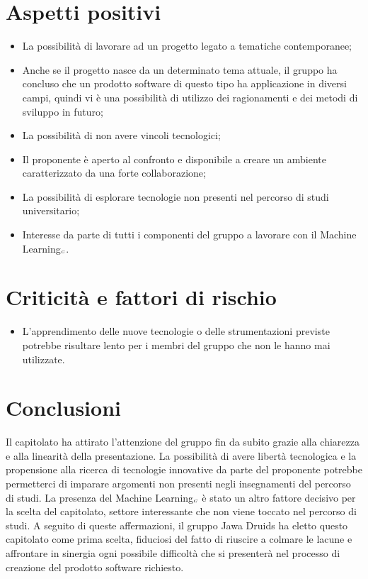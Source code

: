 \section{Aspetti positivi} \label{C3AspettiPositivi}
\begin{itemize}
	\item La possibilità di lavorare ad un progetto legato a tematiche contemporanee;
	\item Anche se il progetto nasce da un determinato tema attuale, il gruppo ha concluso che un prodotto software di questo tipo ha applicazione in diversi campi, quindi vi è una possibilità di utilizzo dei ragionamenti e dei metodi di sviluppo in futuro;
	\item La possibilità di non avere vincoli tecnologici;
	\item Il proponente è aperto al confronto e disponibile a creare un ambiente caratterizzato da una forte collaborazione;
	\item La possibilità di esplorare tecnologie non presenti nel percorso di studi universitario;
	\item Interesse da parte di tutti i componenti del gruppo a lavorare con il Machine Learning$_{\scaleto{G}{3pt}}$.
\end{itemize}
\section{Criticità e fattori di rischio} \label{C3CriticitàEFattoriDiRischio}
\begin{itemize}
	\item L'apprendimento delle nuove tecnologie o delle strumentazioni previste potrebbe risultare lento per i membri del gruppo che non le hanno mai utilizzate.
\end{itemize}
\section{Conclusioni} \label{C3Conclusioni}
Il capitolato ha attirato l'attenzione del gruppo fin da subito grazie alla chiarezza e alla linearità della presentazione. La possibilità di avere libertà tecnologica e la propensione alla ricerca di tecnologie innovative da parte del proponente potrebbe permetterci di imparare argomenti non presenti negli insegnamenti del percorso di studi. La presenza del Machine Learning$_{\scaleto{G}{3pt}}$ è stato un altro fattore decisivo per la scelta del capitolato, settore interessante che non viene toccato nel percorso di studi. A seguito di queste affermazioni, il gruppo Jawa Druids ha eletto questo capitolato come prima scelta, fiduciosi del fatto di riuscire a colmare le lacune e affrontare in sinergia ogni possibile difficoltà che si presenterà nel processo di creazione del prodotto software richiesto.